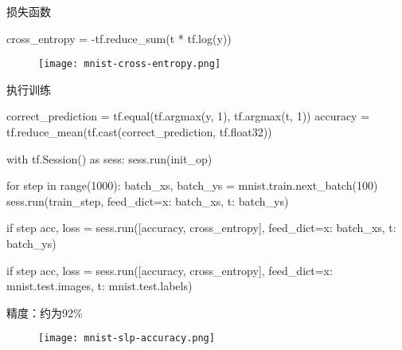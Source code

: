 \begin{frame}[fragile]{损失函数}
  \begin{python}
cross_entropy = -tf.reduce_sum(t * tf.log(y))
  \end{python}

  \begin{figure}
    \centering
    \texttt{[image: mnist-cross-entropy.png]}
  \end{figure}
\end{frame}

\begin{frame}[fragile]{执行训练}
\begin{python}
correct_prediction = tf.equal(tf.argmax(y, 1), tf.argmax(t, 1))
accuracy = tf.reduce_mean(tf.cast(correct_prediction, tf.float32))

with tf.Session() as sess:
  sess.run(init_op)

  for step in range(1000):
    batch_xs, batch_ys = mnist.train.next_batch(100)        
    sess.run(train_step, feed_dict={x: batch_xs, t: batch_ys})

    if step %
      acc, loss = sess.run([accuracy, cross_entropy], 
        feed_dict={x: batch_xs, t: batch_ys})
    
    if step %
      acc, loss = sess.run([accuracy, cross_entropy], 
        feed_dict={x: mnist.test.images, t: mnist.test.labels}) 
\end{python}
\end{frame}

\begin{frame}[fragile]{精度：约为92\%}
  \begin{figure}
    \centering
    \texttt{[image: mnist-slp-accuracy.png]}
  \end{figure}
\end{frame}



